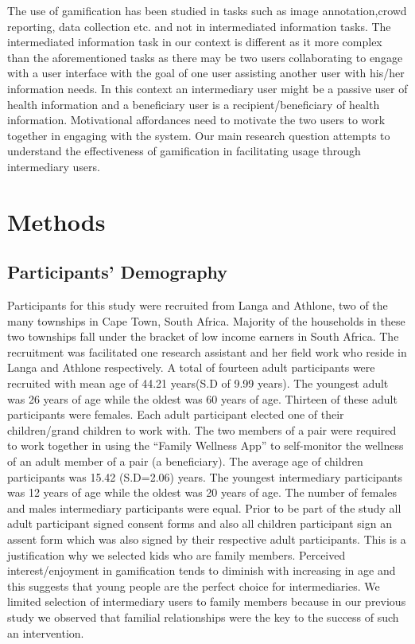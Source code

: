 \documentclass{sig-alternate}
\begin{document}
The use of gamification has been studied in tasks such as image annotation\cite{mekler2013:points,mekler2013:disassembling},crowd reporting\cite{crowley2012:gamification}, data collection \cite{cechanowicz2013:effects} etc. and not in intermediated information tasks. The intermediated information task in our context is different as it more complex than the aforementioned tasks as there may be two users collaborating to engage with a user interface with the goal of one user assisting another user with his/her information needs. In this context an intermediary  user might be a passive user of health information and a beneficiary user is a recipient/beneficiary of health information. Motivational affordances need to motivate the two users to work together in engaging with the system.\newline
Our main research question attempts to understand the effectiveness of gamification in facilitating usage through intermediary users.
\section{Methods}
\subsection{Participants' Demography}
Participants for this study were recruited from Langa and Athlone, two of the many townships in Cape Town, South Africa. Majority of the households in these two townships fall under the bracket of low income earners in South Africa. The recruitment was facilitated one research assistant and her field work who reside in Langa and Athlone respectively.\newline
A total of fourteen adult participants were recruited with mean age of 44.21 years(S.D of 9.99 years). The youngest adult was 26 years of age while the oldest was 60 years of age. Thirteen of these adult participants were females. Each adult participant elected one of their children/grand children to work with. The two members of a pair were required to work together in using the ``Family Wellness App'' to self-monitor the wellness of an adult member of a pair (a beneficiary). The average age of children participants was 15.42 (S.D=2.06) years. The youngest intermediary participants was 12 years of age while the oldest was 20 years of age. The number of females and males intermediary participants were equal. Prior to be part of the study all adult participant signed consent forms and also all children participant sign an assent form which was also signed by their respective adult participants.\newline 
This is a justification why we selected kids who are family members. Perceived interest/enjoyment in gamification tends to diminish with increasing in age \cite{v2014motivational} and this suggests that young people are the perfect choice for intermediaries. We limited selection of intermediary users to family members because in our previous study we observed that familial relationships were the key to the success of such an intervention.  
\end{document}
